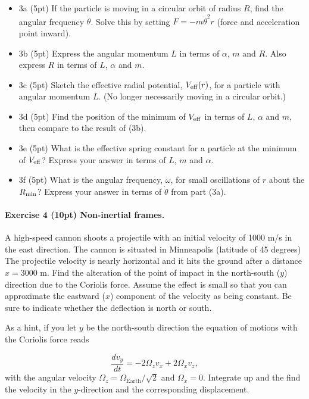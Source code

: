 \documentclass[%
oneside,                 %
final,                   %
10pt]{article}
\begin{document}
\begin{itemize}
\item 3a (5pt)  If the particle is moving in a circular orbit of radius $R$, find the angular frequency $\dot{\theta}$. Solve this by setting $F=-m\dot{\theta}^2r$ (force and acceleration point inward).

\item 3b (5pt) Express the angular momentum $L$ in terms of $\alpha$, $m$ and $R$. Also express $R$ in terms of $L$, $\alpha$ and $m$.

\item 3c (5pt) Sketch the effective radial potential, $V_{\rm eff}(r)$, for a particle with angular momentum $L$. (No longer necessarily moving in a circular orbit.)

\item 3d (5pt)  Find the position of the minimum of $V_{\rm eff}$ in terms of $L$, $\alpha$ and $m$, then compare to the result of (3b).

\item 3e (5pt)  What is the effective spring constant for a particle at the minimum of $V_{\rm eff}$? Express your answer in terms of $L$, $m$ and $\alpha$. 

\item 3f (5pt)  What is the angular frequency, $\omega$, for small oscillations of $r$ about the $R_{\rm min}$?  Express your answer in terms of $\dot{\theta}$ from part (3a).
\end{itemize}

\noindent
\paragraph{Exercise 4 (10pt) Non-inertial frames.}
A high-speed cannon shoots a projectile with an initial velocity of
1000 m/s in the east direction. The cannon is situated in
Minneapolis (latitude of 45 degrees) The projectile velocity is
nearly horizontal and it hits the ground after a distance $x=3000$
  m. Find the alteration of the point of impact in the north-south
  ($y$) direction due to the Coriolis force. Assume the effect is
  small so that you can approximate the eastward ($x$) component of
  the velocity as being constant. Be sure to indicate whether the
  deflection is north or south.

As a hint, if you let $y$ be the north-south direction the equation of motions with the Coriolis force reads

\[
\frac{dv_y}{dt}= -2\Omega_zv_x + 2\Omega_xv_z,
\]
with the angular velocity $\Omega_z=\Omega_{\mathrm{Earth}}/\sqrt{2}$ and $\Omega_x=0$.
Integrate up and the find the velocity in the $y$-direction and the corresponding displacement. 
\end{document}
